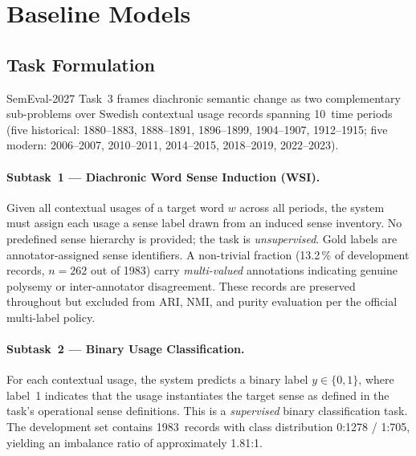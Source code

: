 ﻿%

\section{Baseline Models}

\subsection{Task Formulation}

SemEval-2027 Task~3 frames diachronic semantic change as two complementary
sub-problems over Swedish contextual usage records spanning 10~time periods
(five historical: 1880--1883, 1888--1891, 1896--1899, 1904--1907, 1912--1915;
five modern: 2006--2007, 2010--2011, 2014--2015, 2018--2019, 2022--2023).

\paragraph{Subtask~1 --- Diachronic Word Sense Induction (WSI).}
Given all contextual usages of a target word $w$ across all periods,
the system must assign each usage a sense label drawn from an induced sense
inventory.  No predefined sense hierarchy is provided; the task is
\emph{unsupervised}.  Gold labels are annotator-assigned sense identifiers.
A non-trivial fraction (13.2\,\% of development records, $n=262$ out of 1983)
carry \emph{multi-valued} annotations indicating genuine polysemy or
inter-annotator disagreement.  These records are preserved throughout but
excluded from ARI, NMI, and purity evaluation per the official multi-label
policy.

\paragraph{Subtask~2 --- Binary Usage Classification.}
For each contextual usage, the system predicts a binary label $y \in \{0,1\}$,
where label~1 indicates that the usage instantiates the target sense as defined
in the task's operational sense definitions.  This is a \emph{supervised}
binary classification task.  The development set contains 1983~records with
class distribution 0:1278 / 1:705, yielding an imbalance ratio of
approximately 1.81:1.


